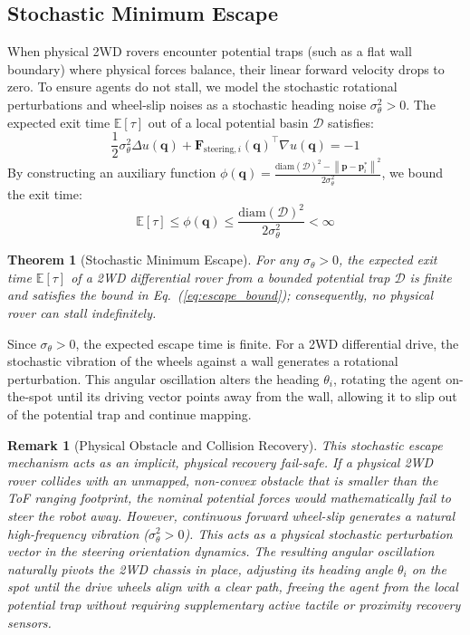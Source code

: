 \documentclass[journal,twoside]{IEEEtran}
\newtheorem{theorem}{Theorem}
\newtheorem{remark}{Remark}
\newcommand{\norm}[1]{\left\lVert#1\right\rVert}
\begin{document}
\subsection{Stochastic Minimum Escape}
When physical 2WD rovers encounter potential traps (such as a flat wall boundary) where physical forces balance, their linear forward velocity drops to zero. To ensure agents do not stall, we model the stochastic rotational perturbations and wheel-slip noises as a stochastic heading noise $\sigma_\theta^2 > 0$. The expected exit time $\mathbb{E}[\tau]$ out of a local potential basin $\mathcal{D}$ satisfies:
\begin{equation}
    \frac{1}{2}\sigma_\theta^2 \Delta u(\mathbf{q}) + \mathbf{F}_{\text{steering}, i}(\mathbf{q})^\top \nabla u(\mathbf{q}) = -1
\end{equation}
By constructing an auxiliary function $\phi(\mathbf{q}) = \frac{\text{diam}(\mathcal{D})^2 - \norm{\mathbf{p} - \mathbf{p}^*_i}^2}{2\sigma_\theta^2}$, we bound the exit time:
\begin{equation}
    \label{eq:escape_bound}
    \mathbb{E}[\tau] \leq \phi(\mathbf{q}) \leq \frac{\text{diam}(\mathcal{D})^2}{2\sigma_\theta^2} < \infty
\end{equation}

\begin{theorem}[Stochastic Minimum Escape]
\label{thm:escape}
For any $\sigma_\theta > 0$, the expected exit time $\mathbb{E}[\tau]$ of a 2WD differential rover from a bounded potential trap $\mathcal{D}$ is finite and satisfies the bound in Eq.~(\ref{eq:escape_bound}); consequently, no physical rover can stall indefinitely.
\end{theorem}

Since $\sigma_\theta > 0$, the expected escape time is finite. For a 2WD differential drive, the stochastic vibration of the wheels against a wall generates a rotational perturbation. This angular oscillation alters the heading $\theta_i$, rotating the agent on-the-spot until its driving vector points away from the wall, allowing it to slip out of the potential trap and continue mapping.

\begin{remark}[Physical Obstacle and Collision Recovery]
This stochastic escape mechanism acts as an implicit, physical recovery fail-safe. If a physical 2WD rover collides with an unmapped, non-convex obstacle that is smaller than the ToF ranging footprint, the nominal potential forces would mathematically fail to steer the robot away. However, continuous forward wheel-slip generates a natural high-frequency vibration ($\sigma_\theta^2 > 0$). This acts as a physical stochastic perturbation vector in the steering orientation dynamics. The resulting angular oscillation naturally pivots the 2WD chassis in place, adjusting its heading angle $\theta_i$ on the spot until the drive wheels align with a clear path, freeing the agent from the local potential trap without requiring supplementary active tactile or proximity recovery sensors.
\end{remark}
\end{document}
